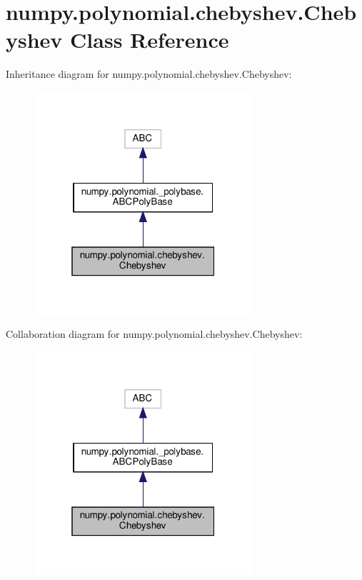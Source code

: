 \hypertarget{classnumpy_1_1polynomial_1_1chebyshev_1_1Chebyshev}{}\section{numpy.\+polynomial.\+chebyshev.\+Chebyshev Class Reference}
\label{classnumpy_1_1polynomial_1_1chebyshev_1_1Chebyshev}


Inheritance diagram for numpy.\+polynomial.\+chebyshev.\+Chebyshev\+:
\nopagebreak
\begin{figure}[H]
\begin{center}
\leavevmode
\includegraphics[width=229pt]{classnumpy_1_1polynomial_1_1chebyshev_1_1Chebyshev__inherit__graph}
\end{center}
\end{figure}


Collaboration diagram for numpy.\+polynomial.\+chebyshev.\+Chebyshev\+:
\nopagebreak
\begin{figure}[H]
\begin{center}
\leavevmode
\includegraphics[width=229pt]{classnumpy_1_1polynomial_1_1chebyshev_1_1Chebyshev__coll__graph}
\end{center}
\end{figure}
